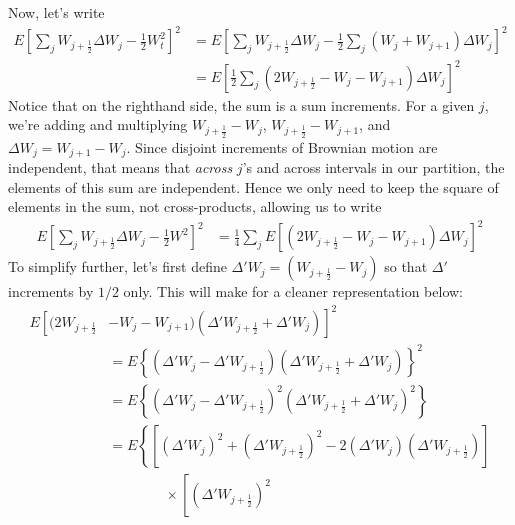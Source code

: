 \documentclass[12pt]{article}
\theoremstyle{plain}
\theoremstyle{definition}
\theoremstyle{remark}
\begin{document}
\begin{enumerate}
\begin{enumerate}
      Now, let's write
      \begin{align*}
        E\left[ \sum_j W_{j+\frac{1}{2}}\Delta W_j - \frac{1}{2}W_t^2
        \right]^2
        &= E\left[ \sum_j W_{j+\frac{1}{2}}\Delta W_j -
          \frac{1}{2}\sum_j (W_j + W_{j+1}) \Delta W_j
        \right]^2\\
        &=
        E\left[ \frac{1}{2}\sum_j \left(2W_{j+\frac{1}{2}} - W_j -
        W_{j+1}\right)\Delta W_j \right]^2
      \end{align*}
      Notice that on the righthand side, the sum is a sum increments.
      For a given $j$, we're adding and multiplying
      $W_{j+\frac{1}{2}}-W_j$, $W_{j+\frac{1}{2}}-W_{j+1}$, and $\Delta
      W_j = W_{j+1}-W_j$. Since disjoint increments of Brownian motion
      are independent, that means that \emph{across} $j$'s and across
      intervals in our partition, the elements of this sum are
      independent. Hence we only need to keep the square of elements in
      the sum, not cross-products, allowing us to write
      \begin{align*}
        E\left[ \sum_j W_{j+\frac{1}{2}}\Delta W_j - \frac{1}{2}W^2
        \right]^2
        &=
        \frac{1}{4}\sum_j E\left[ \left(2W_{j+\frac{1}{2}} - W_j -
        W_{j+1}\right)\Delta W_j \right]^2
      \end{align*}
      To simplify further, let's first define $\Delta' W_j=
      (W_{j+\frac{1}{2}} - W_j)$ so that $\Delta'$ increments by $1/2$
      only. This will make for a cleaner representation below:
      \begin{align*}
        E\left[(2W_{j+\frac{1}{2}}
        \right. &\left.
        - W_j -W_{j+1})(\Delta' W_{j+\frac{1}{2}} + \Delta' W_j)\right]^2\\
        &=
        E\left\{
          \left(\Delta' W_{j} - \Delta' W_{j+\frac{1}{2}}\right)
          (\Delta' W_{j+\frac{1}{2}} + \Delta' W_j)
          \right\}^2\\
        &=
        E\left\{
          \left(\Delta' W_{j} - \Delta' W_{j+\frac{1}{2}}\right)^2
          (\Delta' W_{j+\frac{1}{2}} + \Delta' W_j)^2
          \right\}\\
        &=
        E\left\{
          \left[
          \left(\Delta' W_{j}\right)^2
          + \left( \Delta' W_{j+\frac{1}{2}}\right)^2
          - 2 (\Delta' W_{j} )( \Delta' W_{j+\frac{1}{2}})
          \right]
          \right. \\ & \qquad \qquad \times \left.
          \left[
            (\Delta' W_{j+\frac{1}{2}})^2 

\end{align*}
\end{enumerate}
\end{enumerate}
\end{document}
